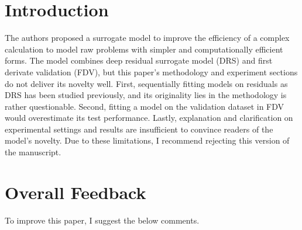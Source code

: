 \documentclass[a4paper, 9pt]{scrartcl}
\title{\titletext}
\begin{document}
\maketitle

\section{Introduction}
The authors proposed a surrogate model to improve the efficiency of a complex
calculation to model raw problems with simpler and computationally efficient
forms. The model combines deep residual surrogate model (DRS) and first derivate
validation (FDV), but this paper's methodology and experiment sections do not
deliver its novelty well. First, sequentially fitting models on residuals as DRS
has been studied previously, and its originality lies in the methodology is rather
questionable. Second, fitting a model on the validation dataset in FDV would
overestimate its test performance. Lastly, explanation and clarification on
experimental settings and results are insufficient to convince readers of the
model's novelty. Due to these limitations, I recommend rejecting this version of
the manuscript.

\section{Overall Feedback}
To improve this paper, I suggest the below comments.
\end{document}
